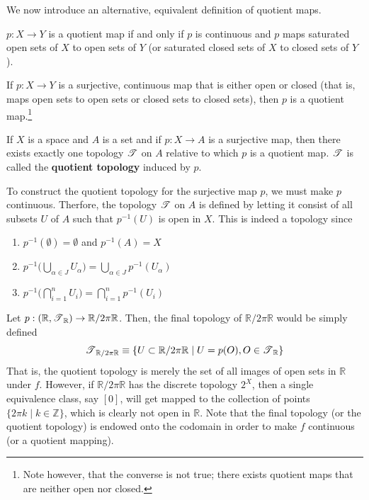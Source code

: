  We now introduce an alternative, equivalent definition of quotient maps. 

  \begin{theorem}
    $p: X \rightarrow Y$ is a quotient map if and only if $p$ is continuous and $p$ maps saturated open sets of $X$ to open sets of $Y$ (or saturated closed sets of $X$ to closed sets of $Y$). 
  \end{theorem}

  \begin{proposition}
    If $p: X \rightarrow Y$ is a surjective, continuous map that is either open or closed (that is, maps open sets to open sets or closed sets to closed sets), then $p$ is a quotient map.\footnote{Note however, that the converse is not true; there exists quotient maps that are neither open nor closed. }
  \end{proposition}

  \begin{definition}
    If $X$ is a space and $A$ is a set and if $p: X \rightarrow A$ is a surjective map, then there exists exactly one topology $\operatorname{\mathscr{T}}$ on $A$ relative to which $p$ is a quotient map. $\operatorname{\mathscr{T}}$ is called the \textbf{quotient topology} induced by $p$. 
  \end{definition}

  To construct the quotient topology for the surjective map $p$, we must make $p$ continuous. Therfore, the topology $\operatorname{\mathscr{T}}$ on $A$ is defined by letting it consist of all subsets $U$ of $A$ such that $p^{-1}(U)$ is open in $X$. This is indeed a topology since
  \begin{enumerate}
    \item $p^{-1} (\emptyset) = \emptyset$ and $p^{-1}(A) = X$
    \item $p^{-1} \Big( \bigcup_{\alpha \in J} U_\alpha \Big) = \bigcup_{\alpha \in J} p^{-1} (U_\alpha)$
    \item $p^{-1} \Big( \bigcap_{i=1}^n U_i \Big) = \bigcap_{i=1}^n p^{-1} (U_i)$
  \end{enumerate}

  \begin{example}
    Let $p: (\mathbb{R}, \operatorname{\mathscr{T}}_\mathbb{R}) \rightarrow \mathbb{R} / 2 \pi \mathbb{R}$. Then, the final topology of $\mathbb{R} / 2 \pi \mathbb{R}$ would be simply defined 
    \begin{equation}
      \operatorname{\mathscr{T}}_{\mathbb{R} / 2 \pi \mathbb{R}} \equiv \{U \subset \mathbb{R} / 2\pi \mathbb{R} \; | \; U = p(O), O \in \operatorname{\mathscr{T}}_\mathbb{R}\}
    \end{equation}
    That is, the quotient topology is merely the set of all images of open sets in $\mathbb{R}$ under $f$. However, if $\mathbb{R} / 2 \pi \mathbb{R}$ has the discrete topology $2^X$, then a single equivalence class, say $[0]$, will get mapped to the collection of points $\{2 \pi k \mid k \in \mathbb{Z}\}$, which is clearly not open in $\mathbb{R}$. Note that the final topology (or the quotient topology) is endowed onto the codomain in order to make $f$ continuous (or a quotient mapping). 
  \end{example}

